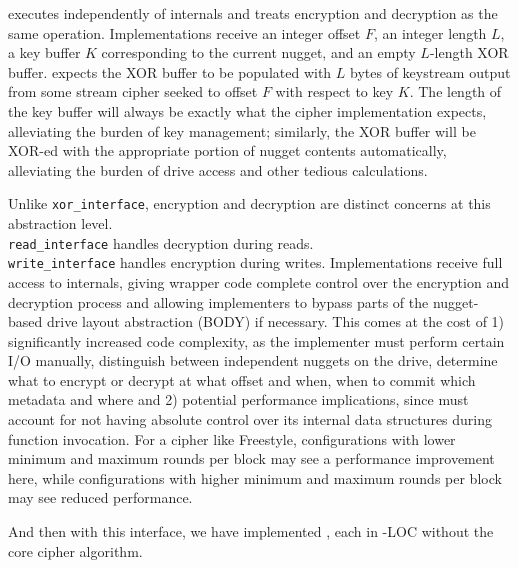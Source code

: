 
 executes independently of \sys internals and
treats encryption and decryption as the same operation. Implementations receive
an integer offset $F$, an integer length $L$, a key buffer $K$ corresponding to
the current nugget, and an empty $L$-length XOR buffer. \sys expects the XOR
buffer to be populated with $L$ bytes of keystream output from some stream
cipher seeked to offset $F$ with respect to key $K$. The length of the key
buffer will always be exactly what the cipher implementation expects,
alleviating the burden of key management; similarly, the XOR buffer will be
XOR-ed with the appropriate portion of nugget contents automatically,
alleviating the burden of drive access and other tedious calculations.


 Unlike
\texttt{xor\_interface}, encryption and decryption are distinct concerns at this
abstraction level. \\\texttt{read\_interface} handles decryption during reads.
\\\texttt{write\_interface} handles encryption during writes. Implementations
receive full access to \sys internals, giving wrapper code complete control over
the encryption and decryption process and allowing implementers to bypass parts
of the nugget-based drive layout abstraction (\ie BODY) if necessary. This comes
at the cost of 1) significantly increased code complexity, as the implementer
must perform certain I/O manually, distinguish between independent nuggets on
the drive, determine what to encrypt or decrypt at what offset and when, when to
commit which metadata and where and 2) potential performance implications, since
\sys must account for not having absolute control over its internal data
structures during function invocation. For a cipher like Freestyle,
configurations with lower minimum and maximum rounds per block may see a
performance improvement here, while configurations with higher minimum and
maximum rounds per block may see reduced performance.

And then with this interface, we have implemented , each in \xxx-\xxx LOC without the core cipher
algorithm.




